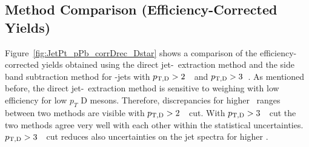 \subsection{Method Comparison (Efficiency-Corrected Yields)}

Figure~\ref{fig:JetPt_pPb_corrDrec_Dstar} shows a comparison of the efficiency-corrected yields obtained using the direct jet-\pt\ extraction method 
and the side band subtraction method for \Dstar-jets with $p_{\mathrm{T,D}}>2$~\GeVc\ and $p_{\mathrm{T,D}}>3$~\GeVc. 
As mentioned before, the direct jet-\pt\ extraction method is sensitive to weighing with low efficiency for low $p_{T}$ D mesons. 
Therefore, discrepancies for higher \ptjet\ ranges between two methods are visible with $p_{\mathrm{T,D}}>2$~\GeVc\ cut. 
With $p_{\mathrm{T,D}}>3$~\GeVc\ cut the two methods agree very well with each other within the statistical uncertainties.
$p_{\mathrm{T,D}}>3$~\GeVc\ cut reduces also uncertainties on the jet spectra for higher \ptjet. 



